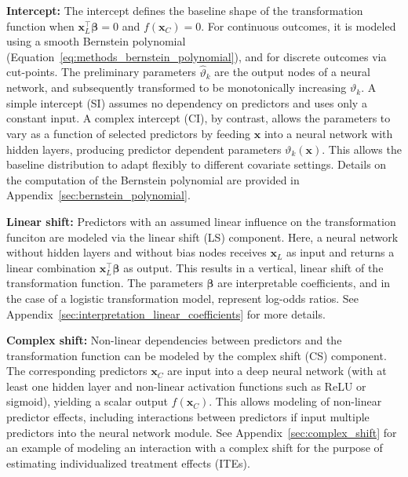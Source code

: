 \medskip


\textbf{Intercept:} The intercept defines the baseline shape of the transformation function when $\mathbf{x}_{L}^\top \boldsymbol{\beta} = 0$ and $f(\mathbf{x}_{C}) = 0$. For continuous outcomes, it is modeled using a smooth Bernstein polynomial (Equation~\ref{eq:methods_bernstein_polynomial}), and for discrete outcomes via cut-points. The preliminary parameters $\hat{\vartheta}_k$ are the output nodes of a neural network, and subsequently transformed to be monotonically increasing $\vartheta_k$. A simple intercept (SI) assumes no dependency on predictors and uses only a constant input. A complex intercept (CI), by contrast, allows the parameters to vary as a function of selected predictors by feeding $\mathbf{x}$ into a neural network with hidden layers, producing predictor dependent parameters $\vartheta_k(\mathbf{x})$. This allows the baseline distribution to adapt flexibly to different covariate settings. Details on the computation of the Bernstein polynomial are provided in Appendix~\ref{sec:bernstein_polynomial}.

\medskip

\textbf{Linear shift:} Predictors with an assumed linear influence on the transformation funciton are modeled via the linear shift (LS) component. Here, a neural network without hidden layers and without bias nodes receives $\mathbf{x}_{L}$ as input and returns a linear combination $\mathbf{x}_{L}^\top \boldsymbol{\beta}$ as output. This results in a vertical, linear shift of the transformation function. The parameters $\boldsymbol{\beta}$ are interpretable coefficients, and in the case of a logistic transformation model, represent log-odds ratios. See Appendix~\ref{sec:interpretation_linear_coefficients} for more details.

\medskip

\textbf{Complex shift:} Non-linear dependencies between predictors and the transformation function can be modeled by the complex shift (CS) component. The corresponding predictors $\mathbf{x}_{C}$ are input into a deep neural network (with at least one hidden layer and non-linear activation functions such as ReLU or sigmoid), yielding a scalar output $f(\mathbf{x}_{C})$. This allows modeling of non-linear predictor effects, including interactions between predictors if input multiple predictors into the neural network module. See Appendix~\ref{sec:complex_shift} for an example of modeling an interaction with a complex shift for the purpose of estimating individualized treatment effects (ITEs).

